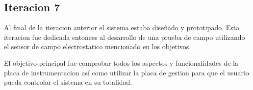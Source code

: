 \subsection{Iteracion 7} %
\label{sub:iteracion_7}

Al final de la iteracion anterior el sistema estaba diseñado y prototipado. Esta iteracion fue dedicada entonces al desarrollo de una prueba de campo utilizando el sensor de campo electrostatico mencionado en los objetivos. 

El objetivo principal fue comprobar todos los aspectos y funcionalidades de la placa de instrumentacion así como utilizar la placa de gestion para que el usuario pueda controlar el sistema en su totalidad.











